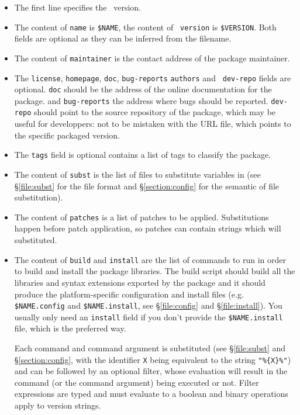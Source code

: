 \documentclass[a4paper,10pt]{article}
\begin{document}
\begin{itemize}

\item The first line specifies the \OPAM\ version.

\item The content of {\tt name} is \verb+$NAME+, the content of {\tt
  version} is \verb+$VERSION+. Both fields are optional as they can
  be inferred from the filename.

\item The content of {\tt maintainer} is the contact address of the
  package maintainer.

\item The {\tt license}, {\tt homepage}, {\tt doc}, {\tt bug-reports} {\tt authors} and {\tt
    dev-repo} fields are optional. {\tt doc} should be the address of the online
  documentation for the package. and {\tt bug-reports} the address where bugs
  should be reported. {\tt dev-repo} should point to the source
  repository of the package, which may be useful for developpers: not to be
  mistaken with the URL file, which points to the specific packaged version.

\item The {\tt tags} field is optional contains a list of tags to
  classify the package.

\item The content of {\tt subst} is the list of files to substitute
  variables in (see \S\ref{file:subst} for the file format and
  \S\ref{section:config} for the semantic of file substitution).

\item The content of {\tt patches} is a list of patches to be applied.
  Substitutions happen before patch application, so patches can
  contain strings which will substituted.

\item The content of {\tt build} and {\tt install} are the list of commands to run in
  order to build and install the package libraries. The build script should build
  all the libraries and syntax extensions exported by the package and
  it should produce the platform-specific configuration and install
  files (e.g. \verb+$NAME.config+ and \verb+$NAME.install+, see
  \S\ref{file:config} and \S\ref{file:install}).
  You usually only need an {\tt install} field if you don't provide the
  \verb+$NAME.install+ file, which is the preferred way.

   Each command and command argument is substituted (see
   \S\ref{file:subst} and \S\ref{section:config}, with the identifier
   {\tt X} being equivalent to the string {\tt "\%\{X\}\%"})
   and can be followed by an optional filter, whose evaluation will
   result in the command (or the command argument) being executed
   or not. Filter expressions are typed and must evaluate to a
   boolean and binary operations apply to version strings.


\end{itemize}
\end{document}

